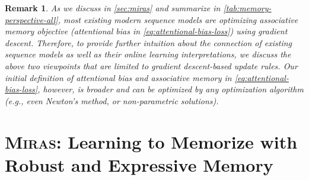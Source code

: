 \documentclass{article}
\newcommand{\framework}[0]{\textsc{Miras}}
\newtheorem{remark}{Remark}
\theoremstyle{plain}
\theoremstyle{definition}
\theoremstyle{remark}
\begin{document}
\begin{remark}
As we discuss in \autoref{sec:miras} and summarize in \autoref{tab:memory-perspective-all}, most existing modern sequence models are optimizing associative memory objective (attentional bias in \autoref{eq:attentional-bias-loss}) using gradient descent. Therefore, to provide further intuition about the connection of existing sequence models as well as their online learning interpretations, we discuss the above two viewpoints that are limited to gradient descent-based update rules. Our initial definition of attentional bias and associative memory in \autoref{eq:attentional-bias-loss}, however, is broader and can be optimized by any optimization algorithm (e.g., even Newton's method, or non-parametric solutions).  
\end{remark}

\section{\framework: Learning to Memorize with Robust and Expressive Memory}\label{sec:miras}
\end{document}
